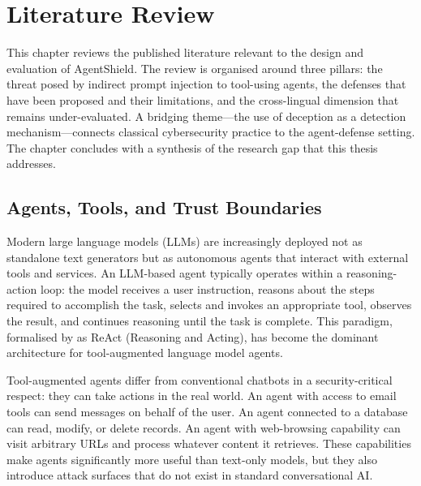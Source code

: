 \chapter{Literature Review}
\label{ch:literature_review}

\begin{justify}
This chapter reviews the published literature relevant to the design and evaluation of AgentShield.  The review is organised around three pillars: the threat posed by indirect prompt injection to tool-using agents, the defenses that have been proposed and their limitations, and the cross-lingual dimension that remains under-evaluated.  A bridging theme---the use of deception as a detection mechanism---connects classical cybersecurity practice to the agent-defense setting.  The chapter concludes with a synthesis of the research gap that this thesis addresses.
\end{justify}


\section{Agents, Tools, and Trust Boundaries}
\label{sec:agents_tools}

\begin{justify}
Modern large language models (LLMs) are increasingly deployed not as standalone text generators but as autonomous agents that interact with external tools and services.  An LLM-based agent typically operates within a reasoning-action loop: the model receives a user instruction, reasons about the steps required to accomplish the task, selects and invokes an appropriate tool, observes the result, and continues reasoning until the task is complete.  This paradigm, formalised by \cite{yao2023react} as ReAct (Reasoning and Acting), has become the dominant architecture for tool-augmented language model agents.
\end{justify}

\begin{justify}
Tool-augmented agents differ from conventional chatbots in a security-critical respect: they can take actions in the real world.  An agent with access to email tools can send messages on behalf of the user.  An agent connected to a database can read, modify, or delete records.  An agent with web-browsing capability can visit arbitrary URLs and process whatever content it retrieves.  These capabilities make agents significantly more useful than text-only models, but they also introduce attack surfaces that do not exist in standard conversational AI.
\end{justify}

